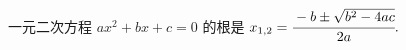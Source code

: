 一元二次方程
\begin{math}
  ax^2 + bx + c = 0
\end{math}
的根是
\begin{math}
  x_{1,2} = \cfrac{-b \pm \sqrt{b^2-4ac}}{2a}.
\end{math}
